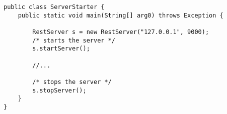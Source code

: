 
\begin{lstlisting}[caption={This is a caption to the code},label=CodeA, frame=tb]
public class ServerStarter {
	public static void main(String[] arg0) throws Exception {
		
		RestServer s = new RestServer("127.0.0.1", 9000);
		/* starts the server */
		s.startServer();
		
		//...
		
		/* stops the server */
		s.stopServer();
	}
}
\end{lstlisting}